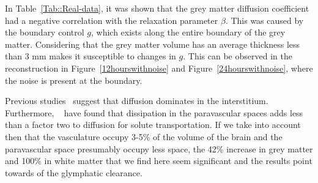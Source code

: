 \documentclass[11pt,a4paper]{article}
\begin{document}
In Table~\ref{Tab::Real-data}, it was shown that the grey matter diffusion coefficient had a negative correlation with the relaxation parameter $\beta$. This was caused by the boundary control $g$, which exists along the entire boundary of the grey matter. Considering that the grey matter volume has an average thickness less than 3 mm makes it susceptible to changes in $g$. This can be observed in the reconstruction in Figure~\ref{12hourswithnoise} and Figure~\ref{24hourswithnoise}, where the noise is present at the boundary.
  
Previous studies~\cite{holter2017interstitial, smith2017glymphatic} suggest that diffusion dominates in the interstitium. Furthermore, 
~\cite{asgari2016glymphatic, brynjfm, Diem} have found that dissipation in the paravascular spaces adds less than a factor two
to diffusion for solute transportation. If we take into account then that the vasculature occupy 3-5\% of the volume
of the brain and the paravascular space presumably occupy less space, the 42\% increase in grey matter and 100\% in white matter  that we find here seem significant and the results point towards of the glymphatic clearance.  

%

 

\end{document}
